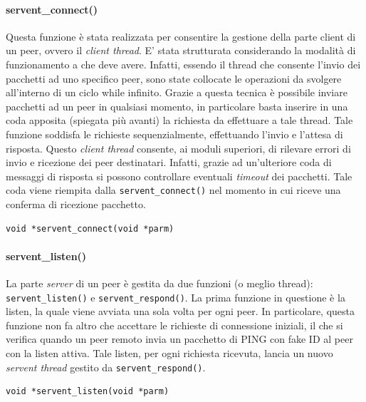 \paragraph{servent\_connect()}
Questa funzione è stata realizzata per consentire la gestione della parte client di un peer, ovvero il \textit{client thread}. E' stata strutturata considerando la modalità di funzionamento a che deve avere. Infatti, essendo il thread che consente l'invio dei pacchetti ad uno specifico peer, sono state collocate le operazioni da svolgere all'interno di un ciclo while infinito. Grazie a questa tecnica è possibile inviare pacchetti ad un peer in qualsiasi momento, in particolare basta inserire in una coda apposita (spiegata più avanti) la richiesta da effettuare a tale thread. Tale funzione soddisfa le richieste sequenzialmente, effettuando l'invio e l'attesa di risposta.
Questo \textit{client thread} consente, ai moduli superiori, di rilevare errori di invio e ricezione dei peer destinatari. Infatti, grazie ad un'ulteriore coda di messaggi di risposta si possono controllare eventuali \textit{timeout} dei pacchetti. Tale coda viene riempita dalla \texttt{servent\_connect()} nel momento in cui riceve una conferma di ricezione pacchetto.
\begin{lstlisting}
void *servent_connect(void *parm)
\end{lstlisting}

\paragraph{servent\_listen()}
La parte \textit{server} di un peer è gestita da due funzioni (o meglio thread): \texttt{servent\_listen()} e \texttt{servent\_respond()}. La prima funzione in questione è la listen, la quale viene avviata una sola volta per ogni peer. In particolare, questa funzione non fa altro che accettare le richieste di connessione iniziali, il che si verifica quando un peer remoto invia un pacchetto di PING con fake ID al peer con la listen attiva. Tale listen, per ogni richiesta ricevuta, lancia un nuovo \textit{servent thread} gestito da \texttt{servent\_respond()}.
\begin{lstlisting}
void *servent_listen(void *parm)
\end{lstlisting}
